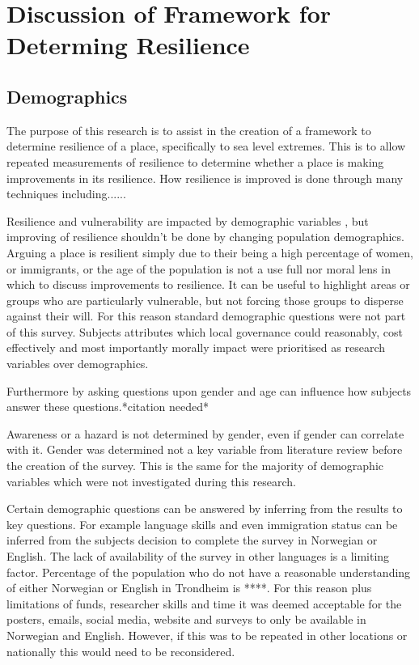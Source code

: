 \chapter{Discussion of Framework for Determing Resilience}

\section{Demographics}
The purpose of this research is to assist in the creation of a framework to determine resilience of a place, specifically to sea level extremes. This is to allow repeated measurements of resilience to determine whether a place is making improvements in its resilience. How resilience is improved is done through many techniques including......

Resilience and vulnerability are impacted by demographic variables \cite{rod_integrated_2012}, but improving of resilience shouldn't be done by changing population demographics. Arguing a place is resilient simply due to their being a high percentage of women, or immigrants, or the age of the population is not a use full nor moral lens in which to discuss improvements to resilience. It can be useful to highlight areas or groups who are particularly vulnerable, but not forcing those groups to disperse against their will. For this reason standard demographic questions were not part of this survey. Subjects attributes which local governance could reasonably, cost effectively and most importantly morally impact were prioritised as research variables over demographics. 

Furthermore by asking questions upon gender and age can influence how subjects answer these questions.*citation needed*

Awareness or a hazard is not determined by gender, even if gender can correlate with it.  Gender was determined not a key variable from literature review before the creation of the survey. This is the same for the majority of demographic variables which were not investigated during this research.

Certain demographic questions can be answered by inferring from the results to key questions. For example language skills and even immigration status can be inferred from the subjects decision to complete the survey in Norwegian or English. The lack of availability of the survey in other languages is a limiting factor. Percentage of the population who do not have a reasonable understanding of either Norwegian or English in Trondheim is ****. For this reason plus limitations of funds, researcher skills and time it was deemed acceptable for the posters, emails, social media, website and surveys to only be available in Norwegian and English. However, if this was to be repeated in other locations or nationally this would need to be reconsidered. 

